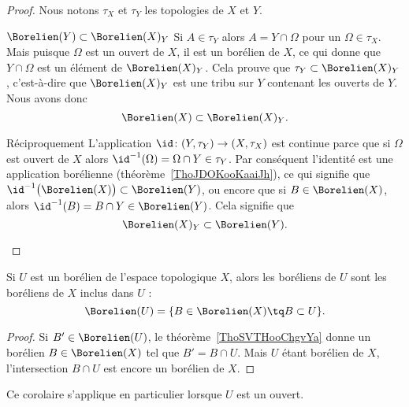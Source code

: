 \begin{proof}
    Nous notons \( \tau_X\) et \( \tau_Y\) les topologies de \( X\) et \( Y\).
    \begin{subproof}
        \item[\( \Borelien(Y)\subset\Borelien(X)_Y\)]
            Si \( A\in \tau_Y\) alors \( A=Y\cap \Omega\) pour un \( \Omega\in \tau_X\). Mais puisque \(\Omega\) est un ouvert de \( X\), il est un borélien de \( X\), ce qui donne que \( Y\cap\Omega\) est un élément de \( \Borelien(X)_Y\). Cela prouve que \( \tau_Y\subset\Borelien(X)_Y\), c'est-à-dire que \( \Borelien(X)_Y\) est une tribu sur \( Y\) contenant les ouverts de \( Y\). Nous avons donc
            \begin{equation}
                \Borelien(X)\subset\Borelien(X)_Y.
            \end{equation}
        \item[Réciproquement]
            L'application \( \id\colon (Y,\tau_Y)\to (X,\tau_X)\) est continue parce que si \( \Omega\) est ouvert de \( X\) alors \( \id^{-1}(\Omega)=\Omega\cap Y\in \tau_Y\). Par conséquent l'identité est une application borélienne (théorème~\ref{ThoJDOKooKaaiJh}), ce qui signifie que \( \id^{-1}\big( \Borelien(X) \big)\subset\Borelien(Y)\), ou encore que si \( B\in\Borelien(X)\), alors \( \id^{-1}(B)=B\cap Y\in\Borelien(Y)\). Cela signifie que
            \begin{equation}
                \Borelien(X)_Y\subset \Borelien(Y).
            \end{equation}
    \end{subproof}
\end{proof}

\begin{corollary}       \label{CorooMJQYooFfwoTd}
    Si \( U\) est un borélien de l'espace topologique \( X\), alors les boréliens de \( U\) sont les boréliens de \( X\) inclus dans \( U\) :
    \begin{equation}
        \Borelien(U)=\{ B\in\Borelien(X)\tq B\subset U \}.
    \end{equation}
\end{corollary}

\begin{proof}
    Si \( B'\in\Borelien(U)\), le théorème~\ref{ThoSVTHooChgvYa} donne un borélien \( B\in\Borelien(X)\) tel que \( B'=B\cap U\). Mais \( U\) étant borélien de \( X\), l'intersection \( B\cap U\) est encore un borélien de \( X\).
\end{proof}
Ce corolaire s'applique en particulier lorsque \( U\) est un ouvert.


